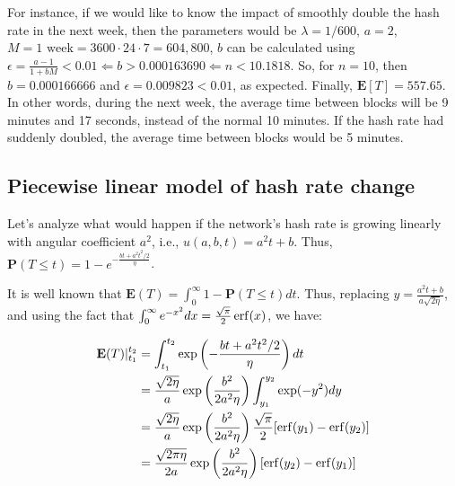 For instance, if we would like to know the impact of smoothly double the hash rate in the next week, then the parameters would be $\lambda = 1/600$, $a=2$, $M=1\text{ week}=3600\cdot24\cdot7 = 604,800$, $b$ can be calculated using $\epsilon = \frac{a-1}{1+bM} < 0.01 \Leftarrow b > 0.000163690 \Leftarrow n < 10.1818$. So, for $n=10$, then $b=0.000166666$ and $\epsilon = 0.009823 < 0.01$, as expected. Finally, $\mathbf{E}[T] = 557.65$. In other words, during the next week, the average time between blocks will be 9 minutes and 17 seconds, instead of the normal 10 minutes. If the hash rate had suddenly doubled, the average time between blocks would be 5 minutes.





\subsection{Piecewise linear model of hash rate change}

Let's analyze what would happen if the network's hash rate is growing linearly with angular coefficient $a^2$, i.e., $u(a, b, t) = a^2t + b$. Thus, $\mathbf{P}(T \leq t) = 1 - e^{-\frac{bt + a^2t^2/2}{\eta}}$.

It is well known that $\mathbf{E}(T) = \int_{0}^{\infty} 1 - \mathbf{P}(T \leq t) dt$. Thus, replacing $y = \frac{a^2 t + b}{a \sqrt{2 \eta}}$, and using the fact that $\int_0^\infty e^{-x^2} dx = \frac{\sqrt{\pi}}{2} \operatorname{erf}(x)$, we have:

\begin{align}
\mathbf{E}(T)|_{t_1}^{t_2} &= \int_{t_1}^{t_2} \exp \left( - \frac{bt + a^2 t^2/2}{\eta} \right) dt \nonumber \\
	&= \frac{\sqrt{2 \eta}}{a} \exp \left( \frac{b^2}{2a^2 \eta} \right) \int_{y_1}^{y_2}  \exp(-y^2) dy \nonumber \\
	&= \frac{\sqrt{2 \eta}}{a} \exp \left( \frac{b^2}{2a^2 \eta} \right) \frac{\sqrt{\pi}}{2} [\operatorname{erf}(y_1) - \operatorname{erf}(y_2)] \nonumber \\
	&= \frac{\sqrt{2 \pi \eta}}{2a} \exp \left( \frac{b^2}{2a^2 \eta} \right) \left[\operatorname{erf}(y_2) - \operatorname{erf}(y_1) \right]
\end{align}

